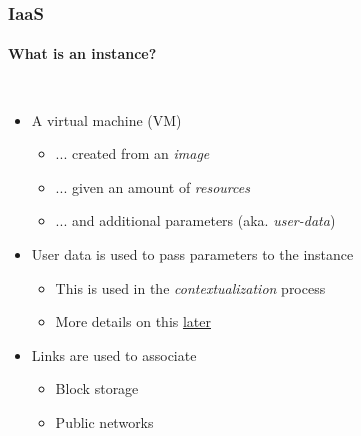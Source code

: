 \begin{frame}
\frametitle{IaaS}
\framesubtitle{What is an instance?}
\begin{columns}
\begin{itemize}
\item A virtual machine (VM)
  \begin{itemize}
  \item ... created from an \emph{image}
  \item ... given an amount of \emph{resources}
  \item ... and additional parameters (aka. \emph{user-data})
  \end{itemize}
\item User data is used to pass parameters to the instance
  \begin{itemize}
  \item This is used in the \emph{contextualization} process
  \item More details on this \hyperlink{part_contextualization}{later}
  \end{itemize}
  \item Links are used to associate
  \begin{itemize}
  \item Block storage
  \item Public networks
  \end{itemize}
\end{itemize}
\end{columns}
\end{frame}

